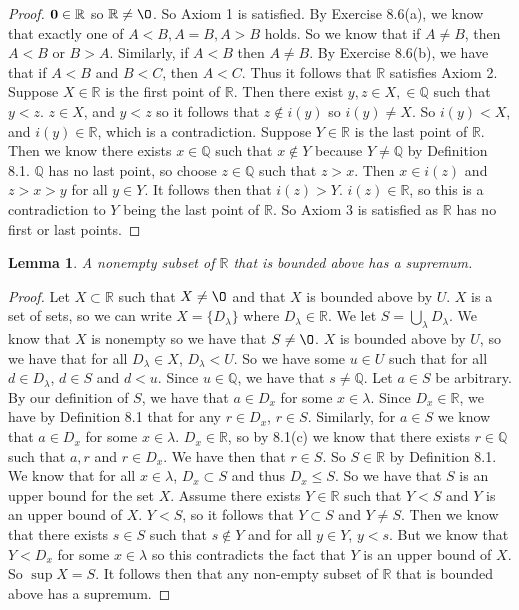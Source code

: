 \documentclass[12pt]{article}
\newcommand{\bbQ}{\mathbb{Q}}
\newcommand{\bbR}{\mathbb{R}}
\renewcommand{\emptyset}{\O}
\renewcommand{\_}[1]{\underline{ #1 }}
\newtheorem{lemma}[theorem]{Lemma}
\theoremstyle{definition}
\numberwithin{equation}{subsection}
\begin{document}
\begin{proof}
${\bf 0} \in \bbR$ so $\bbR \not = \emptyset$. So Axiom 1 is satisfied. By Exercise 8.6(a), we know that exactly one of $A < B, A = B, A > B$ holds. So we know that if $A \not = B$, then $A < B$ or $B > A$.  Similarly, if $A < B$ then $A \not = B$. By Exercise 8.6(b), we have that if $A < B$ and $B < C$, then $A < C$. Thus it follows that $\bbR$ satisfies Axiom 2. Suppose $X \in \bbR$ is the first point of $\bbR$. Then there exist $y,z \in X, \in \bbQ$ such that $y < z$. $z \in X$, and $y < z$ so it follows that $z \not \in i(y)$ so $i(y) \not = X$. So $i(y) < X$, and $i(y) \in \bbR$, which is a contradiction. Suppose $Y \in \bbR$ is the last point of $\bbR$. Then we know there exists $x \in \bbQ$ such that $x \not \in Y$ because $Y \not = \bbQ$ by Definition 8.1. $\bbQ$ has no last point, so choose $z \in \bbQ$ such that $z > x$. Then $x \in i(z)$ and $z > x > y$ for all $y \in Y$. It follows then that $i(z) > Y$. $i(z) \in \bbR$, so this is a contradiction to $Y$ being the last point of $\bbR$. So Axiom 3 is satisfied as $\bbR$ has no first or last points.
\end{proof}

\begin{lemma}
A nonempty subset of $\bbR$ that is bounded above has a supremum.
\end{lemma}

\begin{proof}
Let $X \subset \bbR$ such that $X \not = \emptyset$ and that $X$ is bounded above by $U$. $X$ is a set of sets, so we can write $X = \{D_{\lambda}\}$ where $D_{\lambda} \in \bbR$. We let $S = \bigcup_{\lambda}D_{\lambda}$. We know that $X$ is nonempty so we have that $S \not = \emptyset$. $X$ is bounded above by $U$, so we have that for all $D_{\lambda} \in X$, $D_{\lambda} < U$. So we have some $u \in U$ such that for all $d \in D_{\lambda}$, $d \in S$ and $d < u$. Since $u \in \bbQ$, we have that $s \not = \bbQ$. \newline
Let $a \in S$ be arbitrary. By our definition of $S$, we have that $a \in D_x$ for some $x \in \lambda$. Since $D_x \in \bbR$, we have by Definition 8.1 that for any $r \in D_x$, $r \in S$. Similarly, for $a \in S$ we know that $a \in D_x$ for some $x \in \lambda$. $D_x \in \bbR$, so by 8.1(c) we know that there exists $r \in \bbQ$ such that $a , r$ and $r \in D_x$. We have then that $r \in S$. So $S \in \bbR$ by Definition 8.1. We know that for all $x \in \lambda$, $D_x \subset S$ and thus $D_x \leq S$. So we have that $S$ is an upper bound for the set $X$. Assume there exists $Y \in \bbR$ such that $Y < S$ and $Y$ is an upper bound of $X$. $Y < S$, so it follows that $Y \subset S$ and $Y \not = S$. Then we know that there exists $s \in S$ such that $s \not \in Y$ and for all $y \in Y$, $y < s$. But we know that $Y < D_x$ for some $x \in \lambda$ so this contradicts the fact that $Y$ is an upper bound of $X$. So $\sup X = S$. It follows then that any non-empty subset of $\bbR$ that is bounded above has a supremum.
\end{proof}
\end{document}
